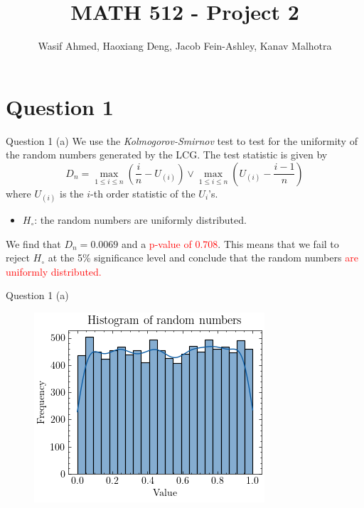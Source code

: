 \documentclass[compress,12pt]{beamer}
\title{MATH 512 - Project 2}
\subtitle{}
\date{}
\author{Wasif Ahmed, Haoxiang Deng, Jacob Fein-Ashley, Kanav Malhotra}
\newcommand{\myRed}[1]{\textcolor{red}{#1}}
\begin{document}
\frame[plain]{\titlepage}

\section{Question 1}

\begin{frame}{Question 1 (a)}
      We use the \emph{Kolmogorov-Smirnov} test to test for the uniformity of the random numbers generated by the LCG. The test statistic is given by
      \begin{equation*}
            D_n = \max_{1 \leq i \leq n} \left( \frac{i}{n} - U_{(i)} \right) \vee \max_{1 \leq i \leq n} \left( U_{(i)} - \frac{i-1}{n} \right)
      \end{equation*}
      where $U_{(i)}$ is the $i$-th order statistic of the $U_i$'s. 
      
      \begin{itemize}
            \item $H_{\circ}$: the random numbers are uniformly distributed. 
      \end{itemize}
      
    \begin{tcolorbox}
      We find that $D_n = 0.0069$ and a \myRed{p-value of $0.708$}. This means that we fail to reject $H_{\circ}$ at the 5\% significance level and conclude that the random numbers \myRed{are uniformly distributed.}
    \end{tcolorbox}
\end{frame}

\begin{frame}{Question 1 (a)}
      \begin{figure}
            \centering
            \includegraphics[scale=0.7]{imgs/1a.png}
      \end{figure}
\end{frame}
\end{document}
